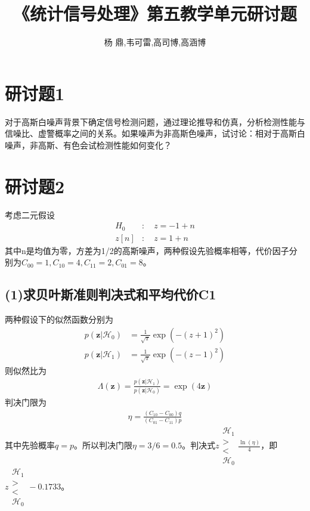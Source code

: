 \documentclass[fontset=windows]{article}
\title{\heiti\zihao{2} 《统计信号处理》第五教学单元研讨题}
\author{杨 鼎,韦可雷,高司博,高涵博}
\date{}
\numberwithin{figure}{section}
\begin{document}
\maketitle
\thispagestyle{empty}



\section*{研讨题1}
对于高斯白噪声背景下确定信号检测问题，通过理论推导和仿真，分析检测性能与信噪比、虚警概率之间的关系。如果噪声为非高斯色噪声，试讨论：相对于高斯白噪声，非高斯、有色会试检测性能如何变化？


\section*{研讨题2}
考虑二元假设
\begin{align*}
    H_0  & :\quad z=-1+n \\
    z[n] & :\quad z=1+n
\end{align*}
其中n是均值为零，方差为1/2的高斯噪声，两种假设先验概率相等，代价因子分别为\(C_{00}=1,C_{10}=4,C_{11}=2,C_{01}=8\)。

\subsection*{(1)求贝叶斯准则判决式和平均代价C1}
两种假设下的似然函数分别为
\begin{align}
    p(\mathbf{z}|\mathcal{H}_0) & =\frac{1}{\sqrt{\pi}}\exp(-(z+1)^2) \\
    p(\mathbf{z}|\mathcal{H}_1) & =\frac{1}{\sqrt{\pi}}\exp(-(z-1)^2)
\end{align}
则似然比为
\begin{align*}
    \Lambda(\mathbf{z})=\frac{p(\mathbf{z}|\mathcal{H}_1)}{p(\mathbf{z}|\mathcal{H}_0)}=\exp(4\mathbf{z})
\end{align*}
判决门限为
\begin{align*}
    \eta=\frac{(C_{10}-C_{00})q}{(C_{01}-C_{11})p}
\end{align*}
其中先验概率\(q=p\)。所以判决门限\(\eta=3/6=0.5\)。判决式\(z\begin{matrix}\mathcal{H}_1\\>\\<\\\mathcal{H_0}\end{matrix}\frac{\ln (\eta)}{4}\)，即\(z\begin{matrix}\mathcal{H}_1\\>\\<\\\mathcal{H_0}\end{matrix}-0.1733\)。
\end{document}
